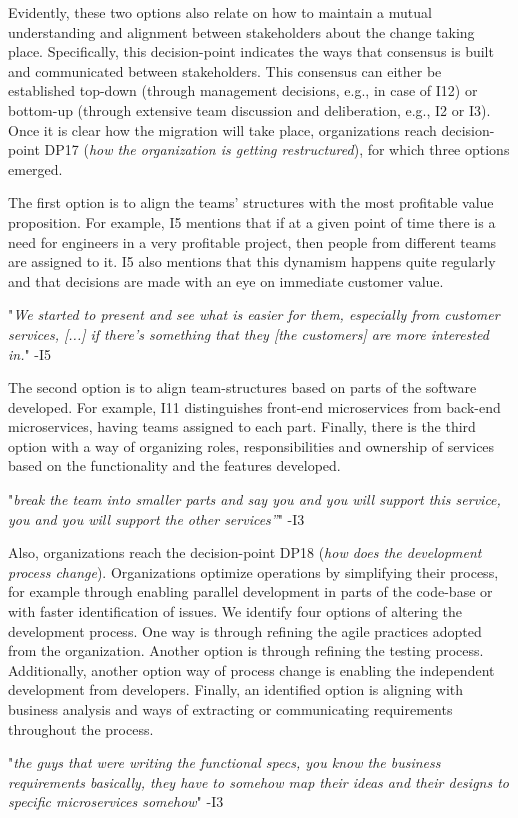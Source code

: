 \documentclass[sigconf,dvipsnames]{acmart}
\newcommand{\interviewquote}[2]{
 \def\FrameCommand{%
    \hspace{0pt}%
    {\color{MidnightBlue}\vrule width 1.5pt}%
    {\color{white}\vrule width 4pt}%
    \colorbox{white}
  }%
  \MakeFramed{\advance\hsize-\width\FrameRestore}%
  \noindent\hspace{-4.55pt}%
  \footnotesize{"\emph{#1}" -{#2}}\vspace{0.5pt}\endMakeFramed%
}
\begin{document}
Evidently, these two options also relate on how to maintain a mutual understanding and alignment between stakeholders about the change taking place. 
Specifically, this decision-point indicates the ways that consensus is built and communicated between stakeholders. 
This consensus can either be established top-down (through management decisions, e.g., in case of I12) or bottom-up (through extensive team discussion and deliberation, e.g., I2 or I3). Once it is clear how the migration will take place, organizations reach decision-point DP17 (\emph{how the organization is getting restructured}), for which three options emerged.

The first option is to align the teams' structures with the most profitable value proposition. For example, I5 mentions that if at a given point of time there is a need for engineers in a very profitable project, then people from different teams are assigned to it. I5 also mentions that this dynamism happens quite regularly and that decisions are made with an eye on immediate customer value.
\interviewquote{We started to present and see what is easier for them, especially from customer services, [...] if there's something that they [the customers] are more interested in.}{I5}

The second option is to align team-structures based on parts of the software developed. For example, I11 distinguishes front-end microservices from back-end microservices, having teams assigned to each part.
Finally, there is the third option with a way of organizing roles, responsibilities and ownership of services based on the functionality and the features developed.
    \interviewquote{break the team into smaller parts and say you and you will support this service, you and you will support the other services”}{I3}

Also, organizations reach the decision-point DP18 (\emph{how does the development process change}). 
Organizations optimize operations by simplifying their process, for example through enabling parallel development in parts of the code-base or with faster identification of issues.
We identify four options of altering the development process. 
One way is through refining the agile practices adopted from the organization.
Another option is through refining the testing process.
Additionally, another option way of process change is enabling the independent development from developers.
Finally, an identified option is aligning with business analysis and ways of extracting or communicating requirements throughout the process.
    \interviewquote{the guys that were writing the functional specs, you know the business requirements basically, they have to somehow map their ideas and their designs to specific microservices somehow}{I3}
\end{document}
